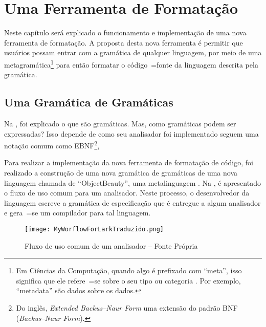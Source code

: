

\chapter{Uma Ferramenta de Formatação}
\label{software_implementation}

Neste capítulo será explicado o funcionamento e
implementação de uma nova ferramenta de formatação.
A proposta desta nova ferramenta é permitir que usuários possam entrar com a gramática de qualquer linguagem,
por meio de uma metagramática\footnote{
Em Ciências da Computação,
quando algo é prefixado com ``meta'',
isso significa que ele refere~=se sobre o seu tipo ou
categoria \cite{theUseOfMetaRules}.
Por exemplo,
``metadata'' são dados sobre os dados.
} para então formatar o código~=fonte da linguagem descrita pela gramática.


\section{Uma Gramática de Gramáticas}

Na ,
foi explicado o que são gramáticas.
Mas,
como gramáticas podem ser expressadas?
Isso depende de como seu analisador foi implementado  seguem uma notação comum como EBNF\footnote{
Do inglês,
\textit{Extended Backus–Naur Form} uma extensão do padrão BNF (\textit{Backus–Naur Form}).
}\cite{teachingEbnf,antlrBookTerrentParr},

Para realizar a implementação da nova ferramenta de formatação de código,
foi realizado a construção de uma nova gramática de gramáticas de uma nova linguagem chamada de ``ObjectBeauty'',
uma metalinguagem \cite{compilersCompilerMetaLanguage}.
Na ,
é apresentado o fluxo de uso comum para um analisador.
Neste processo,
o desenvolvedor da linguagem escreve a gramática de especificação que é entregue a algum analisador e
gera~=se um compilador para tal linguagem.
\begin{figure}[h]
\centering
\texttt{[image: MyWorflowForLarkTraduzido.png]}
\caption[Fluxo de uso comum de um analisador]{Fluxo de uso comum de um analisador -- Fonte Própria \cite{larkErrorRecovery}}
\label{MyWorflowForLarkTraduzido}
\end{figure}


